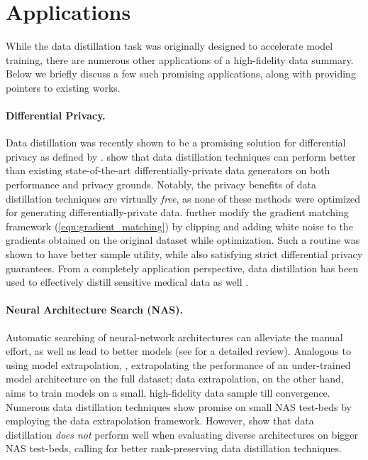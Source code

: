 \documentclass[10pt]{article} %
\begin{document}
\section{Applications} \label{sec:applications}
While the data distillation task was originally designed to accelerate model training, there are numerous other applications of a high-fidelity data summary. Below we briefly discuss a few such promising applications, along with providing pointers to existing works.

\paragraph{Differential Privacy.} Data distillation was recently shown to be a promising solution for differential privacy as defined by \citet{differential_privacy_dwork}. \citet{privacy_free} show that data distillation techniques can perform better than existing state-of-the-art differentially-private data generators \citep{dp_merf, dp_sinkhorn} on both performance and privacy grounds. Notably, the privacy benefits of data distillation techniques are virtually \emph{free}, as none of these methods were optimized for generating differentially-private data. \citet{dd_privacy_clipped} further modify the gradient matching framework (\cref{eqn:gradient_matching}) by clipping and adding white noise to the gradients obtained on the original dataset while optimization. Such a routine was shown to have better sample utility, while also satisfying strict differential privacy guarantees. From a completely application perspective, data distillation has been used to effectively distill sensitive medical data as well \citep{medical_dd_1, medical_dd_2}. 

\paragraph{Neural Architecture Search (NAS).} Automatic searching of neural-network architectures can alleviate the manual effort, as well as lead to better models
(see \citet{nas_survey} for a detailed review). Analogous to using model extrapolation, \ie, extrapolating the performance of an under-trained model architecture on the full dataset; data extrapolation, on the other hand, aims to train models on a small, high-fidelity data sample till convergence. Numerous data distillation techniques \citep{zhao_dc, dd_nas} show promise on small NAS test-beds by employing the data extrapolation framework. However, \citet{dc_bench} show that data distillation \emph{does not} perform well when evaluating diverse architectures on bigger NAS test-beds, calling for better rank-preserving data distillation techniques.
\end{document}
